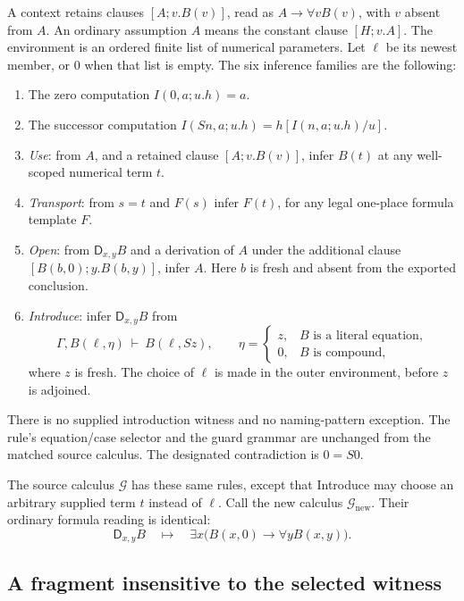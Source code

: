 A context retains clauses $[A;v.B(v)]$, read as
$A\to\forall v B(v)$, with $v$ absent from $A$.  An ordinary
assumption $A$ means the constant clause $[H;v.A]$.  The environment is
an ordered finite list of numerical parameters.  Let $\ell$ be its
newest member, or $0$ when that list is empty.  The six inference
families are the following:
\begin{enumerate}
\item The zero computation $I(0,a;u.h)=a$.
\item The successor computation
      $I(Sn,a;u.h)=h[I(n,a;u.h)/u]$.
\item \emph{Use}: from $A$, and a retained clause $[A;v.B(v)]$,
      infer $B(t)$ at any well-scoped numerical term $t$.
\item \emph{Transport}: from $s=t$ and $F(s)$ infer $F(t)$,
      for any legal one-place formula template $F$.
\item \emph{Open}: from $\mathsf D_{x,y}B$ and a derivation of $A$
      under the additional clause $[B(b,0);y.B(b,y)]$, infer $A$.
      Here $b$ is fresh and absent from the exported conclusion.
\item \emph{Introduce}: infer $\mathsf D_{x,y}B$ from
\[
       \Gamma,B(\ell,\eta)\ \vdash\ B(\ell,Sz),
       \qquad
       \eta=\begin{cases}
             z,&B\text{ is a literal equation},\\
             0,&B\text{ is compound},
             \end{cases}
       \tag{GI}\label{eq:guarded-newest-intro}
\]
      where $z$ is fresh.  The choice of $\ell$ is made in the
      outer environment, before $z$ is adjoined.
\end{enumerate}
There is no supplied introduction witness and no naming-pattern exception.
The rule's equation/case selector and the guard grammar are unchanged
from the matched source calculus.  The designated contradiction is
$0=S0$.

The source calculus $\mathcal G$ has these same rules, except that
Introduce may choose an arbitrary supplied term $t$ instead of $\ell$.
Call the new calculus $\mathcal G_{\mathrm{new}}$.  Their ordinary
formula reading is identical:
\[
 \mathsf D_{x,y}B
   \quad\mapsto\quad
 \exists x\bigl(B(x,0)\to\forall y B(x,y)\bigr).
\]

\subsection{A fragment insensitive to the selected witness}

